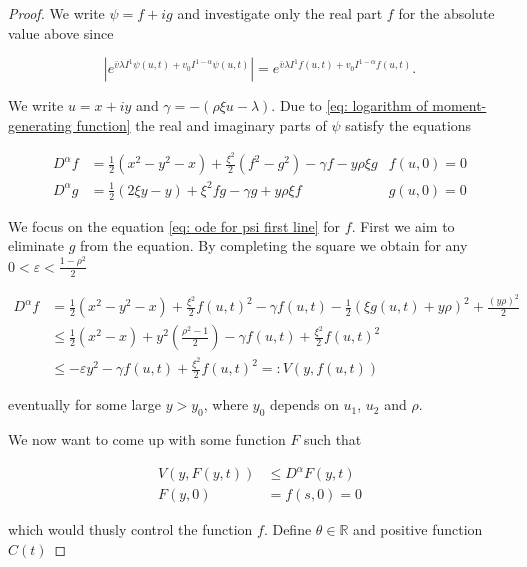 \documentclass[12pt,twoside]{article}
\theoremstyle{plain}
\theoremstyle{plain}
\theoremstyle{definition}
\theoremstyle{remark}
\numberwithin{equation}{section}
\begin{document}
\begin{proof}

We write $\psi = f + ig$ and investigate only the real part $f$ for the absolute value above since

$$
\left|e^{\bar{v} \lambda I^{1} \psi(u, t)+v_{0} I^{1-\alpha} \psi(u, t)}\right|=e^{\bar{v} \lambda I^{1} f(u, t)+v_{0} I^{1-\alpha} f(u, t)}.
$$

We write $u=x+iy$ and $\gamma = -(\rho \xi u - \lambda)$. Due to \eqref{eq: logarithm of moment-generating function} the real and imaginary parts of $\psi$ satisfy the equations


\begin{align}
D^\alpha f &=\frac{1}{2}\left(x^{2}-y^{2}-x\right)+\frac{\xi^{2}}{2}\left(f^{2}-g^{2}\right)-\gamma f - y\rho \xi g&  f(u, 0)=0 \label{eq: ode for psi first line} \\[5pt]
D^\alpha g &=\frac{1}{2}(2 \xi y-y)+\xi^{2} f g-\gamma g + y\rho \xi f &g(u, 0)=0 \label{eq: ode for psi second line}
\end{align}


We focus on the equation \eqref{eq: ode for psi first line} for $f$. First we aim to eliminate $g$ from the equation. By completing the square we obtain for any $0<\varepsilon <\frac{1-\rho^2}{2}$

$$
\begin{aligned} D^\alpha f &=\frac{1}{2}\left(x^{2}-y^{2}-x\right)+\frac{\xi^{2}}{2} f(u, t)^{2}-\gamma f(u, t) - \frac 12 (\xi g(u, t) + y \rho)^2 + \frac{(y\rho)^2}{2} \\[5pt]
& \leq \frac{1}{2}\left(x^{2}-x\right)+ y^2\left(\frac{\rho^2-1}{2}\right)-\gamma f (u, t) +\frac{\xi^{2}}{2} f(u, t)^{2} \\[5pt]
& \leq - \varepsilon y^2 -\gamma f(u, t)+\frac{\xi^{2}}{2} f(u, t)^{2} =: V(y,f(u, t))
\end{aligned} $$

eventually for some large $y>y_0$, where $y_0$ depends on $u_1$, $u_2$ and $\rho$.

We now want to come up with some function $F$ such that

\begin{equation}
\label{eq: tails lemma conditions on F}
\begin{aligned}
V(y,F(y,t))&\leq D^\alpha F(y,t)\\[10pt]
F(y, 0)&=f(s, 0)=0
\end{aligned}
\end{equation}

which would thusly control the function $f$. Define $\theta \in \mathbb R$ and positive function $C(t)$


\end{proof}
\end{document}
